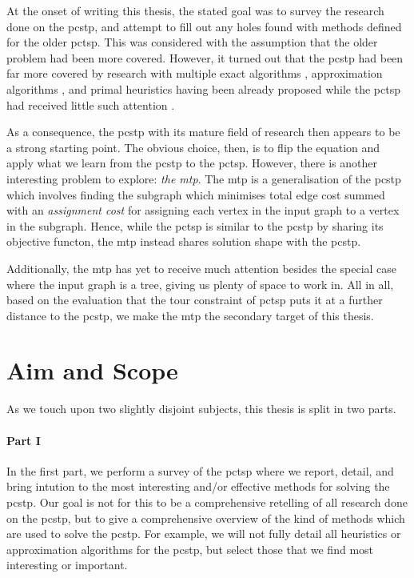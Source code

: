 At the onset of writing this thesis, the stated goal was to
survey the research done
on the \gls{pcstp}, and attempt to fill out any holes found with methods defined for the older
\gls{pctsp}. This was considered with the assumption that the older problem had
been more covered.
However, it turned out that the \gls{pcstp} had been far more covered
by research with multiple exact algorithms
\citep{ljubic2005solving, leitner2016dual, gamrath2017scip},
approximation algorithms \citep{Bienstock1993,goemans1995general,Johnson:2000:PCS:338219.338637},
and primal heuristics \citep{canuto2001local,fu2014knowledge,akhmedov2016divide}
having been already proposed while the \gls{pctsp} had received little such attention
\citep{archetti2014chapter}.

As a consequence, the \gls{pcstp} with its mature field of research then appears to be a strong
starting point. The obvious choice, then, is to flip the equation and apply what we learn
from the \gls{pcstp} to the \gls{pctsp}.
However, there is another interesting problem to explore: \textit{the \gls{mtp}}.
The \gls{mtp} is a generalisation of the \gls{pcstp}
which involves finding the subgraph which minimises total edge cost summed with an
\textit{assignment cost} for assigning each vertex in the input graph to a vertex in
the subgraph. Hence, while the \gls{pctsp} is similar to the \gls{pcstp} by sharing
its objective functon, the \gls{mtp} instead shares solution shape with the \gls{pcstp}.

Additionally, the \gls{mtp} has yet to receive much attention
besides the special case where the input graph is
a tree, giving us plenty of space to work in. All in all, based on the evaluation
that the tour constraint of \gls{pctsp}
puts it at a further distance to the \gls{pcstp}, we make the \gls{mtp}
the secondary target of this thesis.
\section{Aim and Scope}
As we touch upon two slightly disjoint subjects, this thesis is split
in two parts.
\paragraph{Part I}

In the first part, we perform a
survey of the \acrlong{pctsp} where we report, detail, and bring intution to the most interesting
and/or effective methods for solving the \gls{pcstp}.
Our goal is not for this to be a comprehensive retelling
of all research done on the \gls{pcstp}, but to give a comprehensive overview of
the kind of methods which are used to solve the \gls{pcstp}.
For example, we will not fully detail all
heuristics or approximation algorithms for the \gls{pcstp},
but select those that we find most interesting or important.

